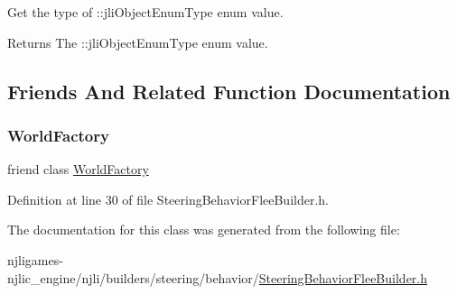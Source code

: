 Get the type of \+::jli\+Object\+Enum\+Type enum value.

\begin{DoxyReturn}{Returns}
The \+::jli\+Object\+Enum\+Type enum value. 
\end{DoxyReturn}


\subsection{Friends And Related Function Documentation}
\mbox{\label{classnjli_1_1_steering_behavior_flee_builder_acb96ebb09abe8f2a37a915a842babfac}} 
\subsubsection{\texorpdfstring{World\+Factory}{WorldFactory}}
{\footnotesize\ttfamily friend class \mbox{\hyperlink{classnjli_1_1_world_factory}{World\+Factory}}\hspace{0.3cm}{\ttfamily [friend]}}



Definition at line 30 of file Steering\+Behavior\+Flee\+Builder.\+h.



The documentation for this class was generated from the following file\+:\begin{DoxyCompactItemize}
\item 
njligames-\/njlic\+\_\+engine/njli/builders/steering/behavior/\mbox{\hyperlink{_steering_behavior_flee_builder_8h}{Steering\+Behavior\+Flee\+Builder.\+h}}\end{DoxyCompactItemize}
